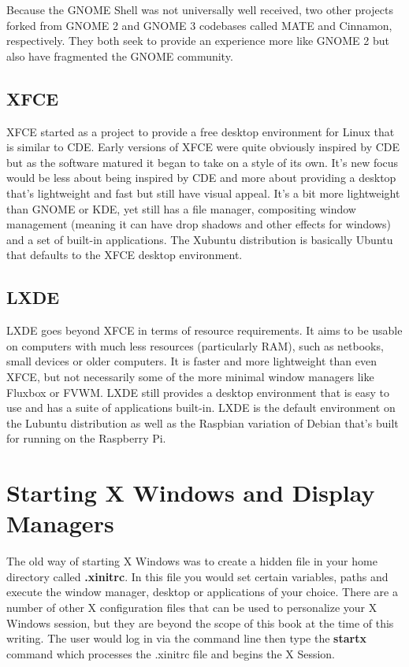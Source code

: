 Because the GNOME Shell was not universally well received, two other projects forked from GNOME 2 and GNOME 3 codebases called MATE and Cinnamon, respectively.  They both seek to provide an experience more like GNOME 2 but also have fragmented the GNOME community.

\subsection{XFCE}

XFCE started as a project to provide a free desktop environment for Linux that is similar to CDE.  Early versions of XFCE were quite obviously inspired by CDE but as the software matured it began to take on a style of its own.  It's new focus would be less about being inspired by CDE and more about providing a desktop that's lightweight and fast but still have visual appeal. It's a bit more lightweight than GNOME or KDE, yet still has a file manager, compositing window management (meaning it can have drop shadows and other effects for windows) and a set of built-in applications.  The Xubuntu distribution is basically Ubuntu that defaults to the XFCE desktop environment.

\subsection{LXDE}

LXDE goes beyond XFCE in terms of resource requirements.  It aims to be usable on computers with much less resources (particularly RAM), such as netbooks, small devices or older computers.  It is faster and more lightweight than even XFCE, but not necessarily some of the more minimal window managers like Fluxbox or FVWM.  LXDE still provides a desktop environment that is easy to use and has a suite of applications built-in.  LXDE is the default environment on the Lubuntu distribution as well as the Raspbian variation of Debian that's built for running on the Raspberry Pi.

\section{Starting X Windows and Display Managers}

The old way of starting X Windows was to create a hidden file in your home directory called \textbf{.xinitrc}.  In this file you would set certain variables, paths and execute the window manager, desktop or applications of your choice.  There are a number of other X configuration files that can be used to personalize your X Windows session, but they are beyond the scope of this book at the time of this writing.  The user would log in via the command line then type the \textbf{startx} command which processes the .xinitrc file and begins the X Session.\\

